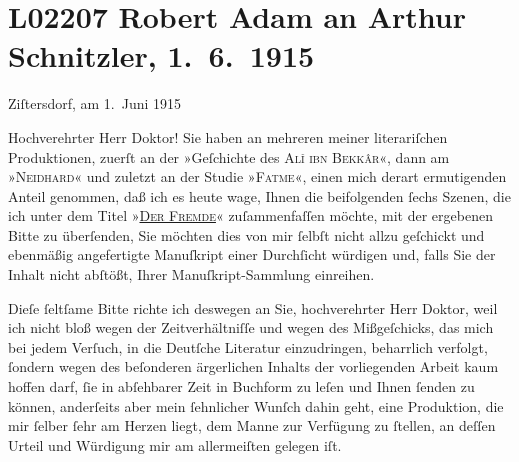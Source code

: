

\section[Robert Adam an Arthur Schnitzler, 1. 6. 1915]{L02207 Robert Adam an Arthur Schnitzler, 1. 6. 1915}
\nopagebreak{}
\rehead{ }\normalsize\beginnumbering{}
\toendnotes[C]{\smallbreak\pagebreak[2]}
\pstart
           \raggedleft{}{\pb}Ziſtersdorf, am 1. Juni 1915\pend
           
\pstart{}Hochverehrter Herr Doktor!\pend\vspace{0.5em}
\pstart
           Sie haben an mehreren meiner literariſchen Produktionen, zuerſt an der »Geſchichte des \textsc{Alî ibn
                     Bekkâr}«, dann am »\textsc{Neidhard}« und zuletzt an der Studie »\textsc{Fatme}«, einen mich derart ermutigenden Anteil genommen, daß ich es heute wage, Ihnen
               die beifolgenden ſechs Szenen, die ich unter dem Titel »\textsc{\uline{Der Fremde}}« zuſammenfaſſen möchte, mit der ergebenen Bitte zu überſenden, Sie möchten dies
               von mir ſelbſt nicht allzu geſchickt und ebenmäßig angefertigte Manuſkript einer
               Durchſicht würdigen und, falls Sie der Inhalt nicht abſtößt, Ihrer
               Manuſkript-Sammlung einreihen.\pend
           
\pstart
           Dieſe ſeltſame Bitte richte ich deswe{\pb}gen an Sie,
               hochverehrter Herr Doktor, weil ich nicht bloß wegen der Zeitverhältniſſe und wegen
               des Mißgeſchicks, das mich bei jedem Verſuch, in die Deutſche Literatur einzudringen,
               beharrlich verfolgt, ſondern wegen des beſonderen ärgerlichen Inhalts der
               vorliegenden Arbeit kaum hoffen darf, ſie in abſehbarer Zeit in Buchform zu leſen und
               Ihnen ſenden zu können, anderſeits aber mein ſehnlicher Wunſch dahin geht, eine
               Produktion, die mir ſelber ſehr am Herzen liegt, dem Manne zur Verfügung zu ſtellen,
               an deſſen Urteil und Würdigung mir am allermeiſten gelegen iſt.\pend
           
